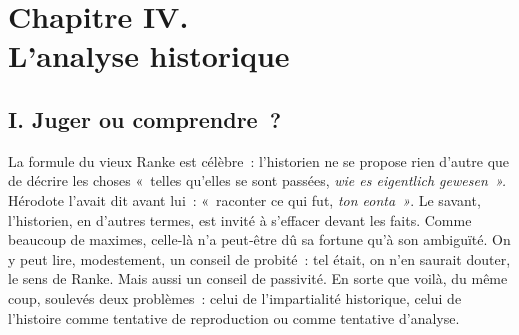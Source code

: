 \documentclass[french,twoside]{book} %
\newcommand{\astermono}{\medskip\centerline{\color{rubric}\large\selectfont{\syms ✻}}\medskip\par}%
\begin{document}
\section[{Chapitre IV. L’analyse historique}]{Chapitre IV. \\
L’analyse historique}\renewcommand{\leftmark}{Chapitre IV. \\
L’analyse historique}

\subsection[{I. Juger ou comprendre ?}]{I. Juger ou comprendre ?}
\noindent La formule du vieux Ranke est célèbre : l’historien ne se propose rien d’autre que de décrire les choses « telles qu’elles se sont passées, \emph{wie es eigentlich gewesen ».} Hérodote l’avait dit avant lui : « raconter ce qui fut, \emph{ton eonta »}. Le savant, l’historien, en d’autres termes, est invité à s’effacer devant les faits. Comme beaucoup de maximes, celle‑là n’a peut‑être dû sa fortune qu’à son ambiguïté. On y peut lire, modestement, un conseil de probité : tel était, on n’en saurait douter, le sens de Ranke. Mais aussi un conseil de passivité. En sorte que voilà, du même coup, soulevés deux problèmes : celui de l’impartialité historique, celui de l’histoire comme tentative de reproduction ou comme tentative d’analyse.\par

\astermono
\end{document}
